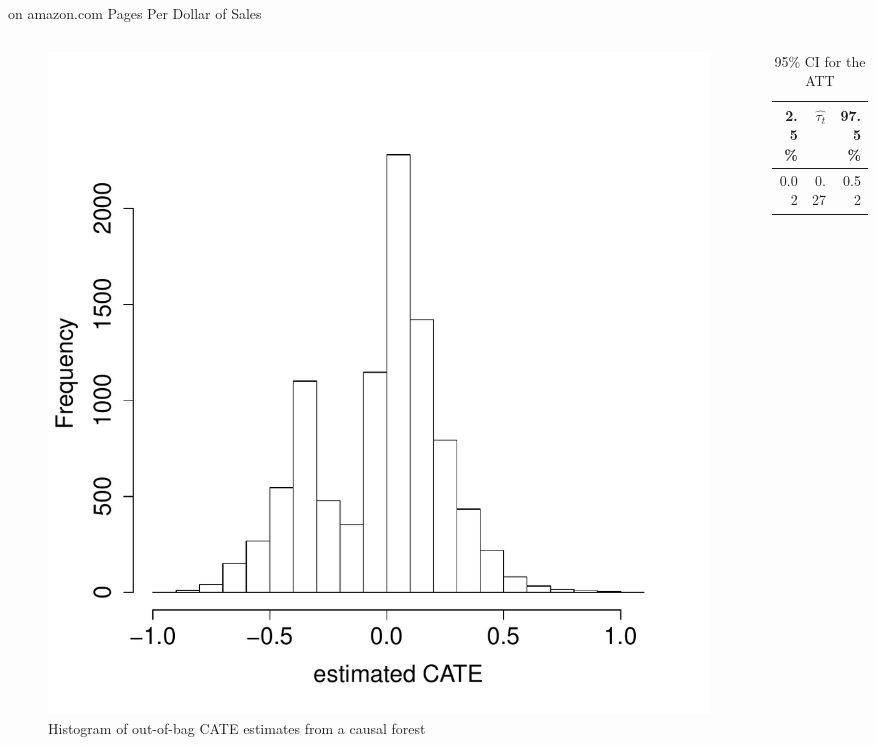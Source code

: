 \documentclass[mathserif, xcolor=table]{beamer}
\begin{document}
\begin{frame}{on amazon.com Pages Per Dollar of Sales}
\vspace{-1em}
\begin{columns}
\begin{column}{.6\textwidth}
 \begin{figure}[h]
    \centering
    \includegraphics[scale=0.3]{figures/tauhat3_ama_hist.pdf}
    \caption{ Histogram of out-of-bag CATE estimates from a causal forest}
    \label{fig:tauhat3_ama_hist}
\end{figure}
 \end{column}

 \begin{column}{.39\textwidth}
 \begin{table}[h]
 \caption{95\% CI for the ATT} 
\centering
\begin{tabular}{rrr}
  \hline
  2.5\%  & $\hat{\tau_t}$ & 97.5\% \\ 
  \hline
 0.02 & 0.27 & 0.52 \\ 
   \hline
\end{tabular}
\end{table}
 \end{column}
\end{columns}
\end{frame}
\end{document}
